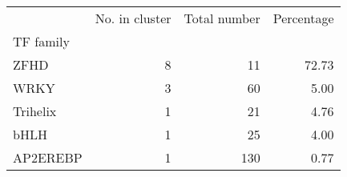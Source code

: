 \begin{tabular}{lrrr}
\toprule
{} &  No. in cluster &  Total number &  Percentage \\
TF family &                 &               &             \\
\midrule
ZFHD      &               8 &            11 &       72.73 \\
WRKY      &               3 &            60 &        5.00 \\
Trihelix  &               1 &            21 &        4.76 \\
bHLH      &               1 &            25 &        4.00 \\
AP2EREBP  &               1 &           130 &        0.77 \\
\bottomrule
\end{tabular}
